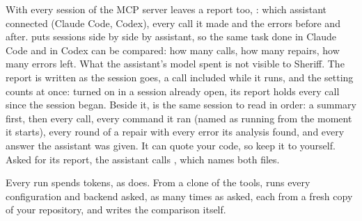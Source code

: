 \documentclass[11pt,a4paper]{article}
\begin{document}
\begin{note}
With  every session of the MCP server leaves a report
too, : which assistant connected
(Claude Code, Codex), every call it made and the errors before and after.
 puts sessions side by side by assistant, so the
same task done in Claude Code and in Codex can be compared: how many calls,
how many repairs, how many errors left. What the assistant's model spent is
not visible to Sheriff. The report is written as the session goes, a call
included while it runs, and the setting counts at once: turned on in a
session already open, its report holds every call since the session began.
Beside it,  is the same session to read
in order: a summary first, then every call, every command it ran (named as
running from the moment it starts), every round
of a repair with every error its analysis found, and every answer the
assistant was given. It can quote your code, so keep it to yourself. Asked
for its report, the assistant calls , which names both
files.
\end{note}

\begin{warning}
Every run spends tokens, as  does. From a clone of the
tools,  runs every configuration and
backend asked, as many times as asked, each from a fresh copy of your
repository, and writes the comparison itself.
\end{warning}
\end{document}
